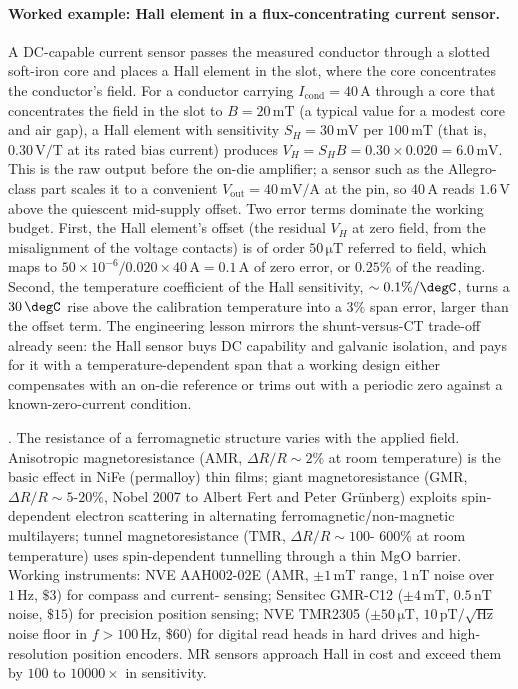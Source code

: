 \paragraph{Worked example: Hall element in a flux-concentrating
current sensor.} A DC-capable current sensor passes the measured
conductor through a slotted soft-iron core and places a Hall
element in the slot, where the core concentrates the conductor's
field. For a conductor carrying $I_{\text{cond}} = 40 \,\si{\ampere}$
through a core that concentrates the field in the slot to
$B = 20 \,\si{\milli\tesla}$ (a typical value for a modest core and
air gap), a Hall element with sensitivity $S_{H} = 30 \,\si{\milli
\volt}$ per $100 \,\si{\milli\tesla}$ (that is, $0.30 \,\si{\volt
\per\tesla}$ at its rated bias current) produces
$V_{H} = S_{H} B = 0.30 \times 0.020 = 6.0 \,\si{\milli\volt}$.
This is the raw output before the on-die amplifier; a sensor such
as the Allegro-class part scales it to a convenient
$V_{\text{out}} = 40 \,\si{\milli\volt\per\ampere}$ at the pin, so
$40 \,\si{\ampere}$ reads $1.6 \,\si{\volt}$ above the quiescent
mid-supply offset. Two error terms dominate the working budget.
First, the Hall element's offset (the residual $V_{H}$ at zero
field, from the misalignment of the voltage contacts) is of order
$50 \,\si{\micro\tesla}$ referred to field, which maps to
$50 \times 10^{-6}/0.020 \times 40 \,\si{\ampere} = 0.1 \,\si{
\ampere}$ of zero error, or $0.25\%$ of the reading. Second, the
temperature coefficient of the Hall sensitivity, $\sim 0.1\%/\degC$,
turns a $30 \,\degC$ rise above the calibration temperature into a
$3\%$ span error, larger than the offset term. The engineering
lesson mirrors the shunt-versus-CT trade-off already seen: the Hall
sensor buys DC capability and galvanic isolation, and pays for it
with a temperature-dependent span that a working design either
compensates with an on-die reference or trims out with a
periodic zero against a known-zero-current condition.

. The resistance of a
ferromagnetic structure varies with the applied field.
Anisotropic magnetoresistance (AMR, $\Delta R/R \sim 2\%$ at room
temperature) is the basic effect in NiFe (permalloy) thin films;
giant magnetoresistance (GMR, $\Delta R/R \sim 5$-$20\%$, Nobel
2007 to Albert Fert and Peter Grünberg) exploits spin-dependent
electron scattering in alternating ferromagnetic/non-magnetic
multilayers; tunnel magnetoresistance (TMR, $\Delta R/R \sim 100$-
$600\%$ at room temperature) uses spin-dependent tunnelling
through a thin MgO barrier. Working instruments: NVE AAH002-02E
(AMR, $\pm 1\,\si{\milli\tesla}$ range, $1\,\si{\nano\tesla}$
noise over $1\,\si{\hertz}$, $\$3$) for compass and current-
sensing; Sensitec GMR-C12 ($\pm 4\,\si{\milli\tesla}$, $0.5\,
\si{\nano\tesla}$ noise, $\$15$) for precision position sensing;
NVE TMR2305 ($\pm 50\,\si{\micro\tesla}$, $10\,\si{\pico\tesla}/
\sqrt{\si{\hertz}}$ noise floor in $f > 100\,\si{\hertz}$, \$60)
for digital read heads in hard drives and high-resolution
position encoders. MR sensors approach Hall in cost and exceed
them by $100$ to $10000\times$ in sensitivity.

